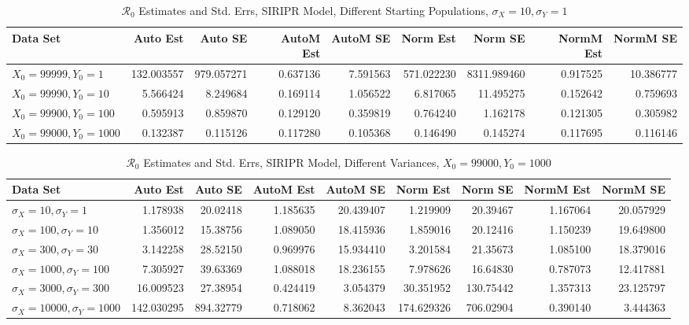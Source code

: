 \documentclass[12pt]{article}
\newcommand{\rr}{\ensuremath{\mathcal{R}_0}}
\begin{document}
\begin{table}[H]
	
	\caption{$\rr$ Estimates and Std. Errs, SIRIPR Model,
		Different Starting Populations, 
		$\sigma_X = 10, \sigma_Y = 1$}
	\begin{footnotesize}
		\hskip -1.7cm
		\begin{tabular}{l|r|r|r|r|r|r|r|r}
			\hline
			Data Set & Auto Est & Auto SE & AutoM Est & AutoM SE & Norm Est & Norm SE & NormM Est & NormM SE\\
			\hline
			$X_0 = 99999, Y_0 = 1$ & 132.003557 & 979.057271 & 0.637136 & 7.591563 & 571.022230 & 8311.989460 & 0.917525 & 10.386777\\
			\hline
			$X_0 = 99990, Y_0 = 10$ & 5.566424 & 8.249684 & 0.169114 & 1.056522 & 6.817065 & 11.495275 & 0.152642 & 0.759693\\
			\hline
			$X_0 = 99900, Y_0 = 100$ & 0.595913 & 0.859870 & 0.129120 & 0.359819 & 0.764240 & 1.162178 & 0.121305 & 0.305982\\
			\hline
			$X_0 = 99000, Y_0 = 1000$ & 0.132387 & 0.115126 & 0.117280 & 0.105368 & 0.146490 & 0.145274 & 0.117695 & 0.116146\\
			\hline
		\end{tabular}
	\end{footnotesize}
\end{table}

\begin{table}[H]
	
	\caption{$\rr$ Estimates and Std. Errs, SIRIPR Model,
		Different Variances, 
		$X_0 = 99000, Y_0 = 1000$}
	\begin{footnotesize}
		\hskip -1.7cm
		\begin{tabular}{l|r|r|r|r|r|r|r|r}
			\hline
			Data Set & Auto Est & Auto SE & AutoM Est & AutoM SE & Norm Est & Norm SE & NormM Est & NormM SE\\
			\hline
			$\sigma_X = 10, \sigma_Y = 1$ & 1.178938 & 20.02418 & 1.185635 & 20.439407 & 1.219909 & 20.39467 & 1.167064 & 20.057929\\
			\hline
			$\sigma_X = 100, \sigma_Y = 10$ & 1.356012 & 15.38756 & 1.089050 & 18.415936 & 1.859016 & 20.12416 & 1.150239 & 19.649800\\
			\hline
			$\sigma_X = 300, \sigma_Y = 30$ & 3.142258 & 28.52150 & 0.969976 & 15.934410 & 3.201584 & 21.35673 & 1.085100 & 18.379016\\
			\hline
			$\sigma_X = 1000, \sigma_Y = 100$ & 7.305927 & 39.63369 & 1.088018 & 18.236155 & 7.978626 & 16.64830 & 0.787073 & 12.417881\\
			\hline
			$\sigma_X = 3000, \sigma_Y = 300$ & 16.009523 & 27.38954 & 0.424419 & 3.054379 & 30.351952 & 130.75442 & 1.357313 & 23.125797\\
			\hline
			$\sigma_X = 10000, \sigma_Y = 1000$ & 142.030295 & 894.32779 & 0.718062 & 8.362043 & 174.629326 & 706.02904 & 0.390140 & 3.444363\\
			\hline
		\end{tabular}
	\end{footnotesize}
\end{table}
\end{document}
